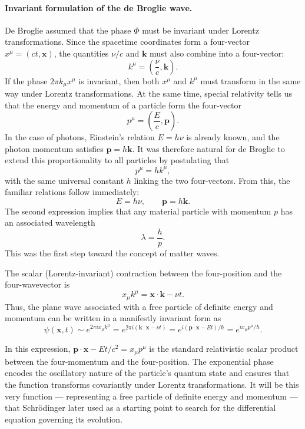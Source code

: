 \paragraph{Invariant formulation of the de Broglie wave.}
De Broglie assumed that the phase $\Phi$ must be invariant under Lorentz transformations. Since the spacetime coordinates form a four-vector $x^\mu = (ct, \mathbf{x})$, the quantities $\nu/c$ and $\mathbf{k}$ must also combine into a four-vector:
\[
    k^\mu = \left(\frac{\nu}{c}, \mathbf{k}\right).
\]
If the phase $2\pi k_\mu x^\mu$ is invariant, then both $x^\mu$ and $k^\mu$ must transform in the same way under Lorentz transformations.
At the same time, special relativity tells us that the energy and momentum of a particle form the four-vector
\[
    p^\mu = \left(\frac{E}{c}, \mathbf{p}\right).
\]
In the case of photons, Einstein’s relation $E = h\nu$ is already known, and the photon momentum satisfies $\mathbf{p} = h\mathbf{k}$.
It was therefore natural for de Broglie to extend this proportionality to all particles by postulating that
\[
    p^\mu = h k^\mu,
\]
with the same universal constant $h$ linking the two four-vectors.
From this, the familiar relations follow immediately:
\[
    E = h\nu, \qquad \mathbf{p} = h\mathbf{k}.
\]
The second expression implies that any material particle with momentum $p$ has an associated wavelength
\[
    \lambda = \frac{h}{p}.
\]
This was the first step toward the concept of matter waves.

The scalar (Lorentz-invariant) contraction between the four-position and the four-wavevector is
\[
    x_\mu k^\mu = \mathbf{x}\cdot\mathbf{k} - \nu t.
\]
Thus, the plane wave associated with a free particle of definite energy and momentum can be written in a manifestly invariant form as
\begin{equation}
    \psi(\mathbf{x},t) \sim e^{2\pi i x_\mu k^\mu}
    = e^{2\pi i(\mathbf{k}\cdot\mathbf{x} - \nu t)}
    = e^{i(\mathbf{p} \cdot \mathbf{x} - Et)/\hbar}
    = e^{i x_\mu p^\mu /\hbar}.
    \label{eq:debroglie_wave_function}
\end{equation}

In this expression, $\mathbf{p}\cdot\mathbf{x} - Et/c^2 = x_\mu p^\mu$ is the standard relativistic scalar product between the four-momentum and the four-position.
The exponential phase encodes the oscillatory nature of the particle’s quantum state and ensures that the function transforms covariantly under Lorentz transformations.
It will be this very function --- representing a free particle of definite energy and momentum --- that Schrödinger later used as a starting point to search for the differential equation governing its evolution.

